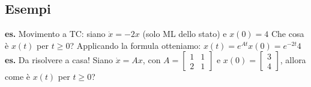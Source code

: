 \subsection{Esempi}
\textbf{es.} Movimento a TC:\newline
siano\newline
$\dot{x} = -2x$ (solo ML dello stato) e $x(0) = 4$\newline
Che cosa è $x(t)$ per $t\geq 0$?\newline
Applicando la formula otteniamo: $x(t) = e^{At}x(0) = e^{-2t}4$\newline
\newline
\textbf{es.} Da risolvere a casa!\newline
Siano $\dot{x} = Ax$, con $A = \left[\begin{matrix}
    1&1\\
    2&1
\end{matrix}\right]$ e $x(0) = \left[\begin{matrix}
    3\\
    4
\end{matrix}\right]$, allora come è $x(t)$ per $t\geq 0$?